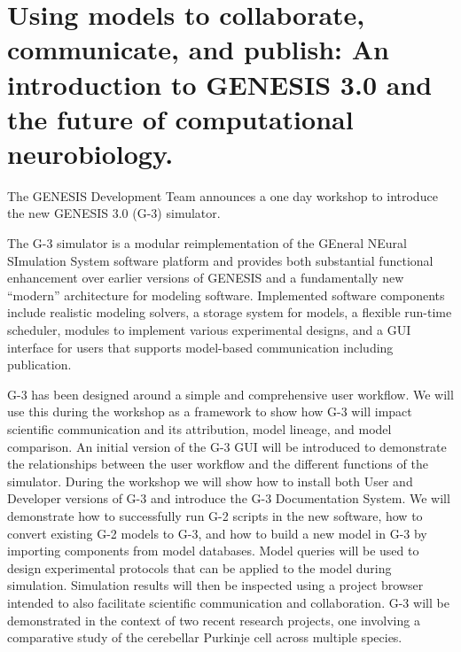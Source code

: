 \documentclass[12pt]{article}
\begin{document}


\section*{Using models to collaborate, communicate, and publish:  An introduction to GENESIS 3.0 and the future of computational neurobiology.}

The GENESIS Development Team announces a one day workshop to introduce the new GENESIS 3.0 (G-3) simulator.

The G-3 simulator is a modular reimplementation of the GEneral NEural SImulation System software platform and provides both substantial functional enhancement over earlier versions of GENESIS and a fundamentally new ``modern'' architecture for modeling software. Implemented software components include realistic modeling solvers, a storage system for models, a flexible run-time scheduler, modules to implement various experimental designs, and a GUI interface for users that supports model-based communication including publication. 

G-3 has been designed around a simple and comprehensive user workflow. We will use this  during the workshop as a framework to show how G-3 will impact scientific communication and its attribution, model lineage, and model comparison. An initial version of the G-3 GUI will be introduced to demonstrate the relationships between the user workflow and the different functions of the simulator. During the workshop we will show how to install both User and Developer versions of G-3 and introduce the G-3 Documentation System. We will demonstrate how to successfully run G-2 scripts in the new software, how to convert existing G-2 models to G-3, and how to build a new model in G-3 by importing components from model databases. Model queries will be used to design experimental protocols that can be applied to the model during simulation. Simulation results will then be inspected using a project browser intended to also facilitate scientific communication and collaboration. G-3 will be demonstrated in the context of two recent research projects, one involving a comparative study of the cerebellar Purkinje cell across multiple species.
\end{document}
